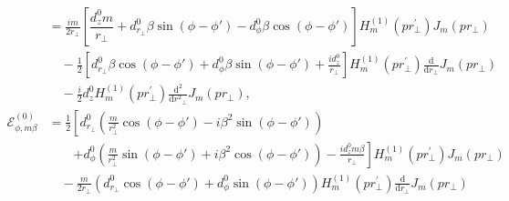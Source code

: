 \documentclass[]{report}
\begin{document}
\begin{align}
&= \frac{im}{2r\!_\perp}\left[ \dfrac{d^0_z m}{r\!_\perp}+d^0_{r\!_\perp}\beta \sin(\phi\!-\!\phi')-d^0_\phi  \beta\cos(\phi\!-\!\phi')\right]H_m^{(1)}\left( {pr\!_\perp^{\prime} }\right) J_{m}\left( pr\!_\perp \right) \nonumber \\
&\quad -\frac{1}{2}\left[d^0_{r\!_\perp}\beta \cos(\phi\!-\!\phi') + d^0_\phi \beta\sin(\phi\!-\!\phi')+\frac{id^0_z}{r\!_\perp} \right] H_m^{(1)}\left( {pr\!_\perp^{\prime} }\right) \frac{\mathrm{d}}{\mathrm{d}r\!_\perp}J_m\left( pr\!_\perp \right)\nonumber\\
&\quad  -\frac{i}{2} d^0_z H_m^{(1)}\left( {pr\!_\perp^{\prime} }\right) \frac{\mathrm{d}^2}{\mathrm{d}r^2\!\!_\perp}J_m\left( pr\!_\perp \right), \\
\mathcal{E}_{\phi,m\beta}^{(0)} 
&= \frac{1}{2}\left[ d^0_{r\!_\perp}\left(\frac{m}{r\!_\perp^2}\cos(\phi\!-\!\phi') \!-\! i\beta^2\sin(\phi\!-\!\phi') \right)\right. \nonumber\\
&\quad\quad\left.+d^0_\phi\left(\frac{m}{r\!_\perp^2}\sin(\phi\!-\!\phi') \!+\! i\beta^2\cos(\phi\!-\!\phi') \right) \!-\! \frac{id^0_z m\beta}{r\!_\perp} \right] H_m^{(1)}\!\left( {pr\!_\perp^{\prime} }\right) J_m\!\left( pr_\perp \right) \nonumber\\
&\quad -\frac{m}{2r\!_\perp} \left(d^0_{r\!_\perp}\cos(\phi\!-\!\phi') \!+\! d^0_\phi\sin(\phi\!-\!\phi') \right) H_m^{(1)}\left( {pr\!_\perp^{\prime} }\right) \frac{\mathrm{d}}{\mathrm{d}r\!_\perp}J_m\left( pr_\perp \right)\nonumber\\

\end{align}
\end{document}
